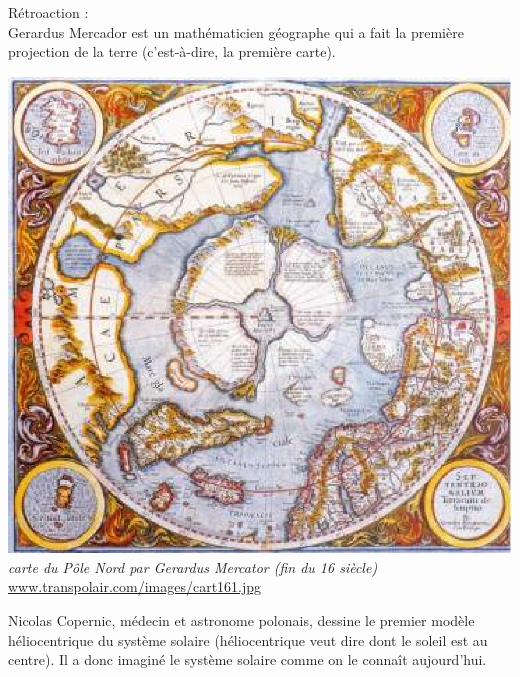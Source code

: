 \documentclass[letterpaper, 12pt]{article}
\begin{document}
R\'etroaction :\\
Gerardus Mercador est un math\'ematicien g\'eographe qui a fait la premi\`ere projection de la terre (c'est-\`a-dire, la premi\`ere carte).
\begin{center}
\includegraphics[scale=0.3]{carte.eps}\\
\emph{{\small carte du P\^ole Nord par Gerardus Mercator (fin du 16\ieme{} si\`ecle)}}\\
\href{http://www.transpolair.com/images/cart161.jpg}{www.transpolair.com/images/cart161.jpg}
\end{center}
Nicolas Copernic, m\'edecin et astronome polonais, dessine le premier mod\`ele h\'eliocentrique du syst\`eme solaire (h\'eliocentrique veut dire dont le soleil est au centre). Il a donc imagin\'e le syst\`eme solaire comme on le conna\^it aujourd'hui.
\end{document}
